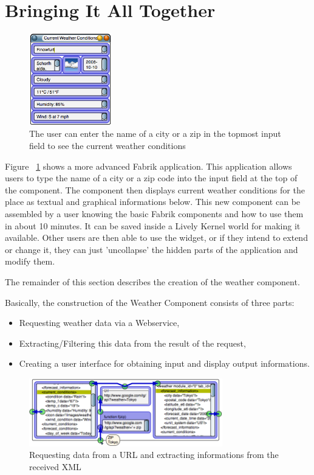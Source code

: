 \documentclass[pdftex, times, 10pt, twocolumn]{article}
\begin{document}
\section{Bringing It All Together}


\begin{figure}[h]\centering
\includegraphics[width=0.320000\textwidth]{weatherExample03.png} 

\caption{The user can enter the name of a city or a zip in the topmost input field to see the current weather conditions }
\label{fig:WeatherExample}
\end{figure}
Figure ~\ref{fig:WeatherExample} shows a more advanced Fabrik application. This application allows users to type the name of a city or a zip code into the input field at the top of the component. The component then displays current weather conditions for the place as textual and graphical informations below. This new component can be assembled by a user knowing the basic Fabrik components and how to use them in about 10 minutes. It can be saved inside a Lively Kernel world for making it available. Other users are then able to use the widget, or if they intend to extend or change it, they can just 'uncollapse' the hidden parts of the application and modify them. 

The remainder of this section describes the creation of the weather component. 

Basically, the construction of the Weather Component consists of three parts: 


\begin{itemize}
  \item Requesting weather data via a Webservice, 
  \item Extracting/Filtering this data from the result of the request, 
  \item Creating a user interface for obtaining input and display output informations. 
\end{itemize}


\begin{figure}[t]\centering
\includegraphics[width=0.750000\textwidth]{weatherExample09.png} 

\caption{Requesting data from a URL and extracting informations from the received XML }
\label{fig:WebrequestInWeatherExample}
\end{figure}
\end{document}
